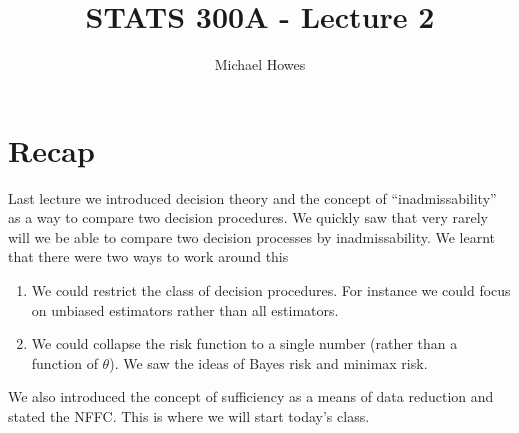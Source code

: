 


\title{STATS 300A - Lecture 2}
\author{Michael Howes}


\maketitle
\section{Recap}
Last lecture we introduced decision theory and the concept of ``inadmissability'' as a way to compare two decision procedures. We quickly saw that very rarely will we be able to compare two decision processes by inadmissability. We learnt that there were two ways to work around this
\begin{enumerate}
    \item We could restrict the class of decision procedures. For instance we could focus on unbiased estimators rather than all estimators. 
    \item We could collapse the risk function to a single number (rather than a function of $\theta$). We saw the ideas of Bayes risk and minimax risk.
\end{enumerate}
We also introduced the concept of sufficiency as a means of data reduction and stated the NFFC. This is where we will start today's class.



